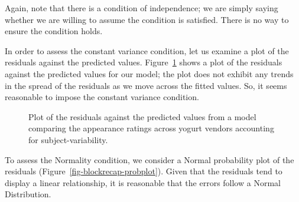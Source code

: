 \documentclass[
  letterpaper,
  DIV=11,
  numbers=noendperiod]{scrreprt}
\theoremstyle{definition}
\theoremstyle{definition}
\theoremstyle{plain}
\theoremstyle{remark}
\begin{document}
Again, note that there is a condition of independence; we are simply
saying whether we are willing to assume the condition is satisfied.
There is no way to ensure the condition holds.

In order to assess the constant variance condition, let us examine a
plot of the residuals against the predicted values.
Figure~\ref{fig-blockrecap-resids} shows a plot of the residuals against
the predicted values for our model; the plot does not exhibit any trends
in the spread of the residuals as we move across the fitted values. So,
it seems reasonable to impose the constant variance condition.

\begin{figure}


\caption{\label{fig-blockrecap-resids}Plot of the residuals against the
predicted values from a model comparing the appearance ratings across
yogurt vendors accounting for subject-variability.}

\end{figure}%

To assess the Normality condition, we consider a Normal probability plot
of the residuals (Figure~\ref{fig-blockrecap-probplot}). Given that the
residuals tend to display a linear relationship, it is reasonable that
the errors follow a Normal Distribution.
\end{document}
